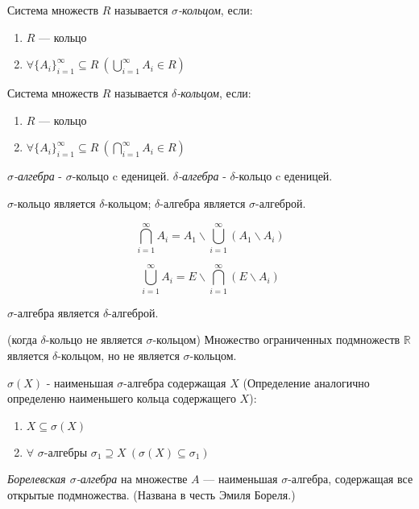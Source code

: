 \Def Система множеств $R$ называется \textit{$\sigma$-кольцом}, если:
\begin{enumerate}
    \item  $R$ — кольцо
    \item  $\forall \{A_i\}^{\infty}_{i=1} \subseteq R \ (\bigcup^{\infty}_{i=1} A_i \in R)$
\end{enumerate}

\Def Система множеств $R$ называется \textit{$\delta$-кольцом}, если:
\begin{enumerate}
    \item $R$ — кольцо
    \item $\forall \{A_i\}^{\infty}_{i=1} \subseteq R \ (\bigcap^{\infty}_{i=1} A_i \in R)$
\end{enumerate}

\Def \textit{$\sigma$-алгебра} - $\sigma$-кольцо c еденицей. \textit{$\delta$-алгебра} - $\delta$-кольцо c еденицей.

\Statement $\sigma$-кольцо является $\delta$-кольцом; $\delta$-алгебра является $\sigma$-алгеброй.

\Proof
$$\bigcap^{\infty}_{i=1} A_i = A_1 \backslash \bigcup^{\infty}_{i=1} (A_1 \backslash A_i)$$

$$\bigcup^{\infty}_{i=1} A_i = E \backslash \bigcap^{\infty}_{i=1} (E \backslash A_i)$$ \EndProof

\Conseq $\sigma$-алгебра является $\delta$-алгеброй.

\Example (когда $\delta$-кольцо не является $\sigma$-кольцом) Множество ограниченных подмножеств $\mathbb{R}$ является $\delta$-кольцом, но не является
$\sigma$-кольцом.

\Def $\sigma(X)$ - наименьшая $\sigma$-алгебра содержащая $X$ (Определение аналогично определеню наименьшего кольца содержащего $X$):

\begin{enumerate} 
    \item $X \subseteq \sigma(X)$
    \item $\forall$ $\sigma$-алгебры $\sigma_1 \supseteq X\ (\sigma(X) \subseteq \sigma_1)$
\end{enumerate} 

\Def \textit{Борелевская $\sigma$-алгебра} на множестве $A$ — наименьшая $\sigma$-алгебра, содержащая все открытые подмножества. (Названа в честь Эмиля Бореля.)
